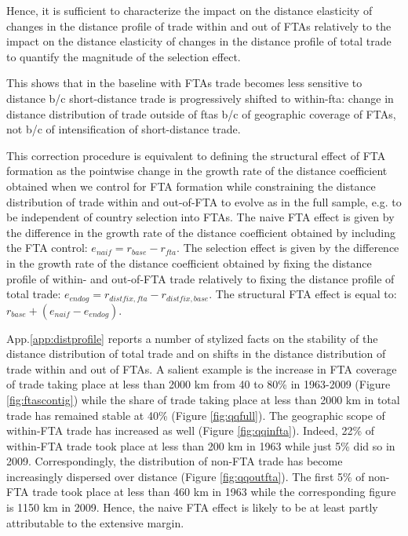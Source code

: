 \documentclass[12pt,twoside,a4paper,notitlepage]{article}
\begin{document}
Hence, it is sufficient to characterize the impact on the distance elasticity of changes in the distance profile of trade within and out of FTAs relatively to the impact on the distance elasticity of changes in the distance profile of total trade to quantify the magnitude of the selection effect.

This shows that in the baseline with FTAs trade becomes less sensitive to distance b/c short-distance trade is progressively shifted to within-fta: change in distance distribution of trade outside of ftas b/c of geographic coverage of FTAs, not b/c of intensification of short-distance trade.

This correction procedure is equivalent to defining the structural effect of FTA formation as the pointwise change in the growth rate of the distance coefficient obtained when we control for FTA formation while constraining the distance distribution of trade within and out-of-FTA to evolve as in the full sample, e.g.
to be independent of country selection into FTAs.
The naive FTA effect is given by the difference in the growth rate of the distance coefficient obtained by including the FTA control: $e_{naif}=r_{base}-r_{fta}$.
The selection effect is given by the difference in the growth rate of the distance coefficient obtained by fixing the distance profile of within- and out-of-FTA trade relatively to fixing the distance profile of total trade: $e_{endog}=r_{distfix,fta}-r_{distfix,base}$.
The structural FTA effect is equal to: $r_{base}+(e_{naif}-e_{endog})$.

App.\ref{app:distprofile} reports a number of stylized facts on the stability of the distance distribution of total trade and on shifts in the distance distribution of trade within and out of FTAs.
A salient example is the increase in FTA coverage of trade taking place at less than 2000 km from 40 to 80\% in 1963-2009 (Figure \ref{fig:ftascontig}) while the share of trade taking place at less than 2000 km in total trade has remained stable at 40\% (Figure \ref{fig:qqfull}).
The geographic scope of within-FTA trade has increased as well (Figure \ref{fig:qqinfta}).
Indeed, 22\% of within-FTA trade took place at less than 200 km in 1963 while just 5\% did so in 2009.
Correspondingly, the distribution of non-FTA trade has become increasingly dispersed over distance (Figure \ref{fig:qqoutfta}).
The first 5\% of non-FTA trade took place at less than 460 km in 1963 while the corresponding figure is 1150 km in 2009.
Hence, the naive FTA effect is likely to be at least partly attributable to the extensive margin.
 
\end{document}
